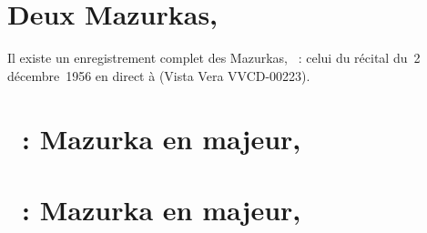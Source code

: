 \begin{workitemize}
 \item{}
 \begin{perfitemize}
  \item{}
  \item{}
 \end{perfitemize}
 \item{}
 \begin{perfitemize}
  \item{}
 \end{perfitemize}
\end{workitemize}

\section*{%
Deux Mazurkas, }

Il existe un enregistrement complet des Mazurkas, ~: celui du
récital du~2 décembre~1956 en direct à \MSHM (Vista Vera VVCD-00223).

\section{\ifChrono \Scriabine{}~: \fi
Mazurka en \kD \Flat majeur,  }
\label{\thesection}

\begin{workitemize}
 \item{}
 \begin{perfitemize}
  \item{}
  \item{}
 \end{perfitemize}
\end{workitemize}

\section{\ifChrono \Scriabine{}~: \fi
Mazurka en \kF \Sharp majeur,  }
\label{\thesection}

